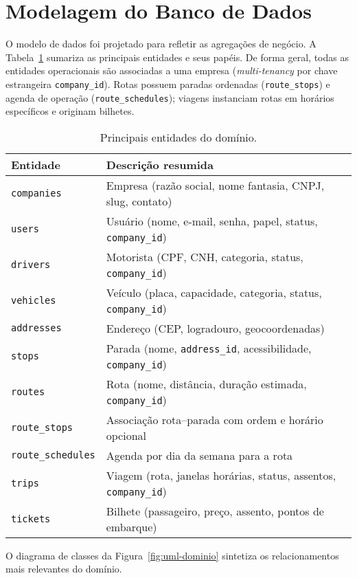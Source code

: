 \section{Modelagem do Banco de Dados}
O modelo de dados foi projetado para refletir as agregações de negócio. A Tabela~\ref{tab:principais-entidades} sumariza as principais entidades e seus papéis. De forma geral, todas as entidades operacionais são associadas a uma empresa (\textit{multi-tenancy} por chave estrangeira \texttt{company\_id}). Rotas possuem paradas ordenadas (\texttt{route\_stops}) e agenda de operação (\texttt{route\_schedules}); viagens instanciam rotas em horários específicos e originam bilhetes.

\begin{table}[H]
\centering
\begin{tabular}{ll}
\toprule
\textbf{Entidade} & \textbf{Descrição resumida} \\
\midrule
\texttt{companies} & Empresa (razão social, nome fantasia, CNPJ, slug, contato) \\
\texttt{users} & Usuário (nome, e-mail, senha, papel, status, \texttt{company\_id}) \\
\texttt{drivers} & Motorista (CPF, CNH, categoria, status, \texttt{company\_id}) \\
\texttt{vehicles} & Veículo (placa, capacidade, categoria, status, \texttt{company\_id}) \\
\texttt{addresses} & Endereço (CEP, logradouro, geocoordenadas) \\
\texttt{stops} & Parada (nome, \texttt{address\_id}, acessibilidade, \texttt{company\_id}) \\
\texttt{routes} & Rota (nome, distância, duração estimada, \texttt{company\_id}) \\
\texttt{route\_stops} & Associação rota–parada com ordem e horário opcional \\
\texttt{route\_schedules} & Agenda por dia da semana para a rota \\
\texttt{trips} & Viagem (rota, janelas horárias, status, assentos, \texttt{company\_id}) \\
\texttt{tickets} & Bilhete (passageiro, preço, assento, pontos de embarque) \\
\bottomrule
\end{tabular}
\caption{Principais entidades do domínio.}
\label{tab:principais-entidades}
\end{table}

O diagrama de classes da Figura~\ref{fig:uml-dominio} sintetiza os relacionamentos mais relevantes do domínio.

